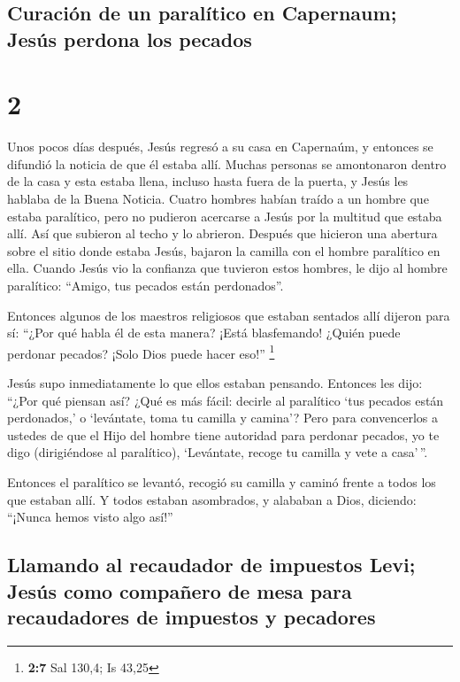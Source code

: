 \hypertarget{curaciuxf3n-de-un-paraluxedtico-en-capernaum-jesuxfas-perdona-los-pecados}{%
\subsection{Curación de un paralítico en Capernaum; Jesús perdona los
pecados}\label{curaciuxf3n-de-un-paraluxedtico-en-capernaum-jesuxfas-perdona-los-pecados}}

\hypertarget{section-1}{%
\section{2}\label{section-1}}

 Unos pocos días después, Jesús regresó a su casa en
Capernaúm, y entonces se difundió la noticia de que él estaba allí.
 Muchas personas se amontonaron dentro de la casa y esta
estaba llena, incluso hasta fuera de la puerta, y Jesús les hablaba de
la Buena Noticia.  Cuatro hombres habían traído a un
hombre que estaba paralítico,  pero no pudieron acercarse
a Jesús por la multitud que estaba allí. Así que subieron al techo y lo
abrieron. Después que hicieron una abertura sobre el sitio donde estaba
Jesús, bajaron la camilla con el hombre paralítico en ella.
 Cuando Jesús vio la confianza que tuvieron estos hombres,
le dijo al hombre paralítico: ``Amigo, tus pecados están perdonados''.

 Entonces algunos de los maestros religiosos que estaban
sentados allí dijeron para sí:  ``¿Por qué habla él de
esta manera? ¡Está blasfemando! ¿Quién puede perdonar pecados? ¡Solo
Dios puede hacer eso!'' \footnote{\textbf{2:7} Sal 130,4; Is 43,25}

 Jesús supo inmediatamente lo que ellos estaban pensando.
Entonces les dijo: ``¿Por qué piensan así?  ¿Qué es más
fácil: decirle al paralítico `tus pecados están perdonados,' o
`levántate, toma tu camilla y camina'?  Pero para
convencerlos a ustedes de que el Hijo del hombre tiene autoridad para
perdonar pecados,  yo te digo (dirigiéndose al
paralítico), `Levántate, recoge tu camilla y vete a casa'\,''.

 Entonces el paralítico se levantó, recogió su camilla y
caminó frente a todos los que estaban allí. Y todos estaban asombrados,
y alababan a Dios, diciendo: ``¡Nunca hemos visto algo así!''

\hypertarget{llamando-al-recaudador-de-impuestos-levi-jesuxfas-como-compauxf1ero-de-mesa-para-recaudadores-de-impuestos-y-pecadores}{%
\subsection{Llamando al recaudador de impuestos Levi; Jesús como
compañero de mesa para recaudadores de impuestos y
pecadores}\label{llamando-al-recaudador-de-impuestos-levi-jesuxfas-como-compauxf1ero-de-mesa-para-recaudadores-de-impuestos-y-pecadores}}

